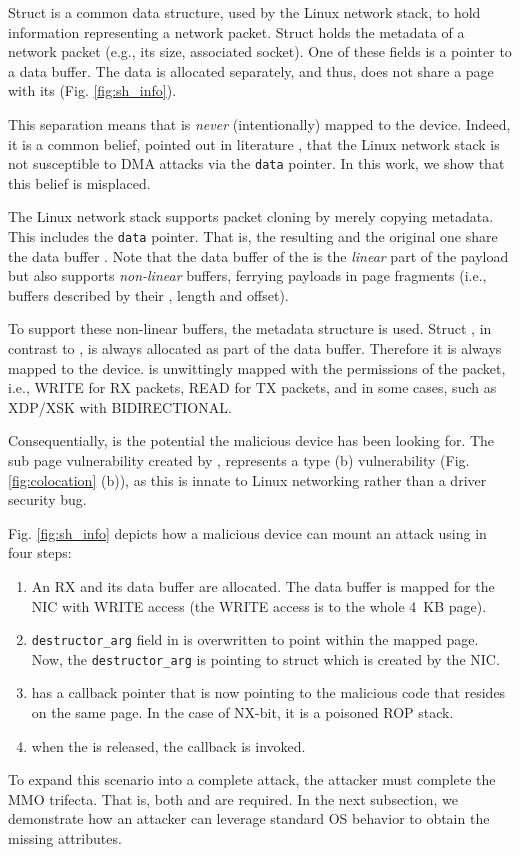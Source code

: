 Struct \skb{} is a common data structure, used by the Linux network stack, to hold information representing a network packet. Struct \skb{} holds the metadata of a network packet (e.g., its size, associated socket). One of these fields is a pointer to a data buffer. The data is allocated separately, and thus, does not share a page with its \skb{} (Fig. \ref{fig:sh_info}). 

This separation means that \skb{} is \emph{never} (intentionally) mapped to the device. Indeed, it is a common belief, pointed out in literature \cite{thunder}, that the Linux network stack is not susceptible to DMA attacks via the \texttt{data} pointer. In this work, we show that this belief is misplaced.

The Linux network stack supports packet cloning by merely copying \skb{} metadata. This includes the \texttt{data} pointer. That is, the resulting \skb{} and the original one share the data buffer \cite{drivers2005linux}. Note that the data buffer of the \skb{} is the \emph{linear} part of the payload but \skb{} also supports \emph{non-linear} buffers, ferrying payloads in page fragments (i.e., buffers described by their \page{}, length and offset). 

To support these non-linear buffers, the \shinfo{} metadata structure is used.
Struct \shinfo{}, in contrast to \skb{}, is always allocated as part of the data buffer. Therefore it is always mapped to the device. \shinfo is unwittingly mapped with the permissions of the packet, i.e., WRITE for RX packets, READ for TX packets, and in some cases, such as XDP/XSK \cite{xdp} with BIDIRECTIONAL.

Consequentially, \shinfo{} is the potential \oportunity{} the malicious device has been looking for. The sub page vulnerability created by \shinfo{}, represents a type (b) vulnerability (Fig. \ref{fig:colocation} (b)), as this is innate to Linux networking rather than a driver security bug. 

Fig. \ref{fig:sh_info} depicts how a malicious device can mount an attack using \shinfo{} in four steps:
\begin{enumerate}[label=(\alph*)]
    \item An RX \skb{} and its data buffer are allocated. The data buffer is mapped for the NIC with WRITE access (the WRITE access is to the whole 4~KB page). 
    \item \texttt{destructor\_arg} field in \shinfo{} is overwritten to point within the mapped page. Now, the \texttt{destructor\_arg} is pointing to struct \uarg{} which is created by the NIC.
    \item \uarg{} has a callback pointer that is now pointing to the malicious code that resides on the same page. In the case of NX-bit, it is a poisoned ROP stack.
    \item when the \skb{} is released, the callback is invoked.
\end{enumerate}
To expand this scenario into a complete attack, the attacker must complete the MMO trifecta. That is, both \means{} and \oportunity{} are required. In the next subsection, we demonstrate how an attacker can leverage standard OS behavior to obtain the missing attributes.

